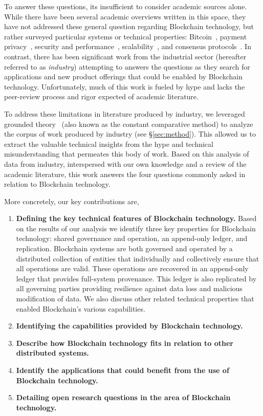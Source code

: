 To answer these questions, its insufficient to consider academic sources alone.
While there have been several academic overviews written in this space, they have not addressed these general question regarding Blockchain technology, but rather surveyed particular systems or technical properties: Bitcoin~\cite{BMC+15,Narayanan17}, payment privacy~\cite{Conti17}, security and performance~\cite{Gervais16}, scalability~\cite{Croman16}, and consensus protocols~\cite{Bano17,garay2018consensus}.
In contrast, there has been significant work from the industrial sector (hereafter referred to as \emph{industry}) attempting to answers the questions as they search for applications and new product offerings that could be enabled by Blockchain technology.
Unfortunately, much of this work is fueled by hype and lacks the peer-review process and rigor expected of academic literature.

To address these limitations in literature produced by industry, we leveraged grounded theory~\cite{glaser1965constant,strauss1990basics,corbin1990grounded} (also known as the constant comparative method) to analyze the corpus of work produced by industry (see \S\ref{sec:method}).
This allowed us to extract the valuable technical insights from the hype and technical misunderstanding that permeates this body of work.
Based on this analysis of data from industry, interspersed with our own knowledge and a review of the academic literature, this work answers the four questions commonly asked in relation to Blockchain technology.

More concretely, our key contributions are,

\begin{enumerate}
	\item \textbf{Defining the key technical features of Blockchain technology.}
	Based on the results of our analysis we identify three key properties for Blockchain technology: shared governance and operation, an append-only ledger, and replication.
	Blockchain systems are both governed and operated by a distributed collection of entities that individually and collectively ensure that all operations are valid.
	These operations are recovered in an append-only ledger that provides full-system provenance.
	This ledger is also replicated by all governing parties providing resilience against data loss and malicious modification of data.
	We also discuss other related technical properties that enabled Blockchain's various capabilities.
	
	\item \textbf{Identifying the capabilities provided by Blockchain technology.}
		
	\item \textbf{Describe how Blockchain technology fits in relation to other distributed systems.}
	
	\item \textbf{Identify the applications that could benefit from the use of Blockchain technology.}
	
	\item \textbf{Detailing open research questions in the area of Blockchain technology.}
	
\end{enumerate}
